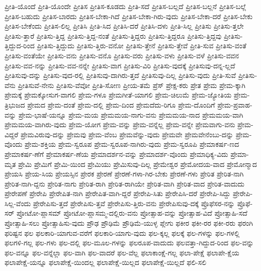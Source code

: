 {ಪ್ರೀತಿ-ಯೊಂದೆ
ಪ್ರೀತಿ-ಯೊಂದೇ
ಪ್ರೀತಿಸ
ಪ್ರೀತಿಸ-ಕೂಡದು
ಪ್ರೀತಿ-ಸದೆ
ಪ್ರೀತಿಸ-ಬಲ್ಲದೆ
ಪ್ರೀತಿಸ-ಬಲ್ಲನೆ
ಪ್ರೀತಿಸ-ಬಲ್ಲೆ
ಪ್ರೀತಿಸ-ಬಹುದು
ಪ್ರೀತಿಸ-ಬಾರದು
ಪ್ರೀತಿಸ-ಬೇಕಾ-ಗಿದೆ
ಪ್ರೀತಿಸ-ಬೇಕಾ-ಗಿರು-ವುದು
ಪ್ರೀತಿಸ-ಬೇಕಾ-ದರೆ
ಪ್ರೀತಿಸ-ಬೇಕು
ಪ್ರೀತಿಸ-ಬೇಕೆಂದು
ಪ್ರೀತಿಸ-ಲಿಲ್ಲ
ಪ್ರೀತಿಸಿ
ಪ್ರೀತಿ-ಸಿದ
ಪ್ರೀತಿಸಿ-ದರೆ
ಪ್ರೀತಿಸಿ-ದಳು
ಪ್ರೀತಿ-ಸಿಲ್ಲ
ಪ್ರೀತಿಸು
ಪ್ರೀತಿಸು-ತ್ತಲೇ
ಪ್ರೀತಿಸು-ತ್ತಾರೆ
ಪ್ರೀತಿಸು-ತ್ತಿದ್ದ
ಪ್ರೀತಿಸು-ತ್ತಿದ್ದ-ನಂತೆ
ಪ್ರೀತಿಸು-ತ್ತಿದ್ದರು
ಪ್ರೀತಿಸು-ತ್ತಿದ್ದರೂ
ಪ್ರೀತಿಸು-ತ್ತಿದ್ದವು
ಪ್ರೀತಿಸು-ತ್ತಿದ್ದುದ-ರಿಂದ
ಪ್ರೀತಿಸು-ತ್ತಿದ್ದುದು
ಪ್ರೀತಿಸು-ತ್ತಿರು-ವನೋ
ಪ್ರೀತಿಸು-ತ್ತೇನೆ
ಪ್ರೀತಿಸು-ತ್ತೇವೆ
ಪ್ರೀತಿ-ಸುವ
ಪ್ರೀತಿಸು-ವಂತೆ
ಪ್ರೀತಿಸು-ವಂತೆಯೇ
ಪ್ರೀತಿಸು-ವನು
ಪ್ರೀತಿಸು-ವನೊ
ಪ್ರೀತಿಸು-ವರು
ಪ್ರೀತಿಸು-ವಳು
ಪ್ರೀತಿಸು-ವಳೆ
ಪ್ರೀತಿಸು-ವವನ
ಪ್ರೀತಿಸು-ವವ-ನನ್ನು
ಪ್ರೀತಿಸು-ವವ-ನನ್ನೇ
ಪ್ರೀತಿಸು-ವಾಗ
ಪ್ರೀತಿಸು-ವಿರಿ
ಪ್ರೀತಿಸು-ವುದಕ್ಕೆ
ಪ್ರೀತಿಸುವು-ದನ್ನ-ಲ್ಲದೆ
ಪ್ರೀತಿಸುವು-ದನ್ನು
ಪ್ರೀತಿಸು-ವುದ-ರಲ್ಲಿ
ಪ್ರೀತಿಸುವು-ದಾಗಿರು-ತ್ತದೆ
ಪ್ರೀತಿಸುವು-ದಿಲ್ಲ
ಪ್ರೀತಿಸು-ವುದು
ಪ್ರೀತಿ-ಸುವೆ
ಪ್ರೀತಿಸು-ವೆನು
ಪ್ರೀತಿಸುವೆ-ನೇನು
ಪ್ರೀತಿಸು-ವೆವೋ
ಪ್ರೀತಿ-ಸೋಣ
ಪ್ರೀಯ-ತಮೆ
ಪ್ರೆಸ್
ಪ್ರೇಕ್ಷ-ಕರು
ಪ್ರೇತ
ಪ್ರೇಮ
ಪ್ರೇಮ-ಕ್ಕಾಗಿ
ಪ್ರೇಮಕ್ಕೆ
ಪ್ರೇಮಕ್ಕೋಸುಗ-ವಾಗಲಿ
ಪ್ರೇಮ-ಗಳೂ
ಪ್ರೇಮಗೀತೆ-ಯಾಗಲಿ
ಪ್ರೇಮ-ಚಿಲುಮೆ
ಪ್ರೇಮ-ಜ್ಯೋತಿಯ
ಪ್ರೇಮ-ತ್ರಿಭುಜದ
ಪ್ರೇಮದ
ಪ್ರೇಮ-ದಂತೆ
ಪ್ರೇಮ-ದಲ್ಲಿ
ಪ್ರೇಮ-ದಿಂದ
ಪ್ರೇಮದೆದು-ರಿಗೂ
ಪ್ರೇಮ-ದೊಂದಿಗೆ
ಪ್ರೇಮ-ಪ್ರವಾಹ-ವನ್ನು
ಪ್ರೇಮ-ಭಾಷೆ-ಯನ್ನೂ
ಪ್ರೇಮ-ಮಯ
ಪ್ರೇಮಮಯ-ನಾಗು-ವನು
ಪ್ರೇಮಮಯ-ನಾದ
ಪ್ರೇಮಮಯ-ವಾಗಿ
ಪ್ರೇಮಮಯ-ವಾಗಿರು-ವುದು
ಪ್ರೇಮ-ಯೋಗ
ಪ್ರೇಮ-ವನ್ನು
ಪ್ರೇಮ-ವನ್ನೆಲ್ಲ
ಪ್ರೇಮ-ವನ್ನೇ
ಪ್ರೇಮವಾಗು-ವನು
ಪ್ರೇಮ-ವಿದ್ದರೆ
ಪ್ರೇಮವಿರುವು-ದನ್ನು
ಪ್ರೇಮವು
ಪ್ರೇಮ-ವೆಂಬ
ಪ್ರೇಮವೆನ್ನು-ವುದು
ಪ್ರೇಮವೇ
ಪ್ರೇಮವೇನೆಂಬು-ದನ್ನು
ಪ್ರೇಮ-ವೊಂದು
ಪ್ರೇಮ-ಶಕ್ತಿಯ
ಪ್ರೇಮ-ಸ್ವರೂಪ
ಪ್ರೇಮ-ಸ್ವರೂಪ-ನಾಗಿರು-ವುದು
ಪ್ರೇಮ-ಸ್ವರೂಪಿ
ಪ್ರೇಮಾಕರ್ಷ-ಣದ
ಪ್ರೇಮಾಕರ್ಷ-ಣೆಗೆ
ಪ್ರೇಮಾಕರ್ಷ-ಣೆಯ
ಪ್ರೇಮಾದರ್ಶನ-ವನ್ನು
ಪ್ರೇಮಾದರ್ಶ-ವೊಂದು
ಪ್ರೇಮಾಧಿಕ್ಯ-ವಿದು
ಪ್ರೇಮಾ-ಮೃತ
ಪ್ರೇಮಿ
ಪ್ರೇಮಿಗೆ
ಪ್ರೇಮಿ-ಯಿಂದ
ಪ್ರೇಮಿಯು
ಪ್ರೇಮಿಸುವು-ದಿಲ್ಲ
ಪ್ರೇಮೇಶ್ವರ
ಪ್ರೇಮೋದಯ-ವಾದ
ಪ್ರೇಮೋನ್ಮಾದ
ಪ್ರೇಯಸಿ
ಪ್ರೇಯ-ಸಿಯ
ಪ್ರೇಯಸ್ಸಿನ
ಪ್ರೇರಕ
ಪ್ರೇರಣೆ
ಪ್ರೇರಣೆ-ಗಳಾ-ಗಿರ-ಬೇಕು
ಪ್ರೇರಣೆ-ಗಳು
ಪ್ರೇರಿತ
ಪ್ರೇರಿತ-ನಾಗಿ
ಪ್ರೇರಿತ-ನಾಗಿ-ದ್ದನು
ಪ್ರೇರಿತ-ನಾಗು
ಪ್ರೇರಿತ-ರಾಗಿ
ಪ್ರೇರಿತ-ರಾಗಿಯೇ
ಪ್ರೇರಿತ-ವಾಗಿ
ಪ್ರೇರಿತ-ವಾದ
ಪ್ರೇರಿತ-ವಾದುದು
ಪ್ರೇರೇಪಣೆ
ಪ್ರೇರೇಪಿ
ಪ್ರೇರೇಪಿತ-ನಾಗಿ
ಪ್ರೇರೇಪಿತ-ವಾಗಿ-ದ್ದರೆ
ಪ್ರೇರೇಪಿ-ಸಿತು
ಪ್ರೇರೇಪಿಸಿ-ದರೆ
ಪ್ರೇರೇಪಿ-ಸಿದ್ದು
ಪ್ರೇರೇಪಿ-ಸಿಲ್ಲ-ವೆಂದು
ಪ್ರೇರೇಪಿಸು-ತ್ತದೆ
ಪ್ರೇರೇಪಿಸು-ತ್ತವೆ
ಪ್ರೇರೇಪಿಸು-ತ್ತಿರು-ವನು
ಪ್ರೇರೇಪಿಸುವು-ದಕ್ಕೆ
ಪ್ರೊಫೆಸರ-ನನ್ನು
ಪ್ರೊಫೆ-ಸರ್
ಪ್ರೋಟೋ-ಪ್ಲಾಸಮ್
ಪ್ರೋಟೋ-ಪ್ಲಾಸಮ್ಮ-ದಲ್ಲಿರು-ವನು
ಪ್ರೋತ್ಸಾಹ-ವನ್ನು
ಪ್ರೋತ್ಸಾಹ-ವಿದೆ
ಪ್ರೋತ್ಸಾಹಿ-ಸದೆ
ಪ್ರೋತ್ಸಾಹಿ-ಸಲು
ಪ್ರೋತ್ಸಾಹಿಸು-ವುದು
ಪ್ರೌಢ
ಪ್ರೌಢಿಮೆ
ಪ್ರೌಢಿಮೆ-ಯುಳ್ಳ
ಪ್ಲೇಗು
ಫಕೀರ
ಫಕೀ-ರರ
ಫಕೀ-ರರು
ಫರಂಗಿ
ಫರಿಷ್ಟನ
ಫಲ
ಫಲಕಾರಿ-ಯಾಗುವ-ವರೆಗೆ
ಫಲಕಾರಿ-ಯಾಗು-ವುದು
ಫಲ-ಕ್ಕಲ್ಲ
ಫಲಕ್ಕೆ
ಫಲ-ಗಳನ್ನು
ಫಲ-ಗಳಲ್ಲಿ
ಫಲಗಳಿ-ಗಲ್ಲ
ಫಲ-ಗಳು
ಫಲ-ದಲ್ಲಿ
ಫಲ-ಮೂಲ-ಗಳನ್ನು
ಫಲರೂಪ-ವಾದುದು
ಫಲವತ್ತಾ-ಗಿದ್ದುದ-ರಿಂದ
ಫಲ-ವನ್ನು
ಫಲ-ವನ್ನೂ
ಫಲ-ವನ್ನೆಲ್ಲಾ
ಫಲ-ವಾಗಿ
ಫಲ-ವಾದರೆ
ಫಲ-ವೆಲ್ಲ
ಫಲಾಕಾಂಕ್ಷೆ-ಗಲ್ಲ
ಫಲಾ-ಪೇಕ್ಷೆ
ಫಲಾಪೇ-ಕ್ಷೆಯ
ಫಲಾಪೇಕ್ಷೆ-ಯನ್ನೂ
ಫಲಾಪೇಕ್ಷೆ-ಯಿಂದಲ್ಲ
ಫಲಾಪೇಕ್ಷೆ-ಯಿಲ್ಲದ
ಫಲಾಪೇಕ್ಷೆ-ಯಿಲ್ಲದೆ
ಫಲಿ-ಸಲಿ
}
